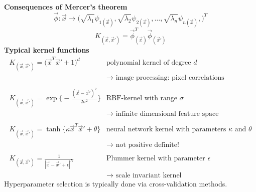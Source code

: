 \textbf{Consequences of Mercer's theorem}
\begin{equation}
	\vec{\phi} : 
		\vec{x} \rightarrow \Big( \sqrt{\lambda_1} \psi_{1 (\vec{x})},
		\sqrt{\lambda_2} \psi_{2 (\vec{x})}, \ldots,
		\sqrt{\lambda_n} \psi_{n (\vec{x})},
		\Big)^T
\end{equation}
\begin{equation}
	K_{(\vec{x}, \vec{x}')} = \vec{\phi}_{(\vec{x})}^T 
		\vec{\phi}_{(\vec{x}')}
\end{equation}
{\bf Typical kernel functions}
\[ \begin{array}{ll}
	K_{(\vec{x}, \vec{x}')} = \big( \vec{x}^T \vec{x}' + 1 \big)^d
	& \text{polynomial kernel of degree } d \\
	& \rightarrow \text{ image processing: pixel correlations} \\\\
	K_{(\vec{x}, \vec{x}')} = \exp \Big\{ -\frac{(\vec{x} - \vec{x}')^2}{
		2 \sigma^2} \Big\}
	& \text{RBF-kernel with range } \sigma \\
	& \rightarrow \text{ infinite dimensional feature space} \\\\
	K_{(\vec{x}, \vec{x}')} = \tanh \big\{ \kappa \vec{x}^T \vec{x}' + \theta
		\big\}
	& \text{neural network kernel with parameters } \kappa \text{ and } \theta\\
	& \rightarrow \text{ not positive definite!} \\\\
	K_{(\vec{x}, \vec{x}')} = \frac{1}{ | \vec{x} - \vec{x}' + \epsilon
		|^N}
	& \text{Plummer kernel with parameter } \epsilon \\
	& \rightarrow \text{ scale invariant kernel}
\end{array} \]
Hyperparameter selection is typically done via cross-validation methods.

